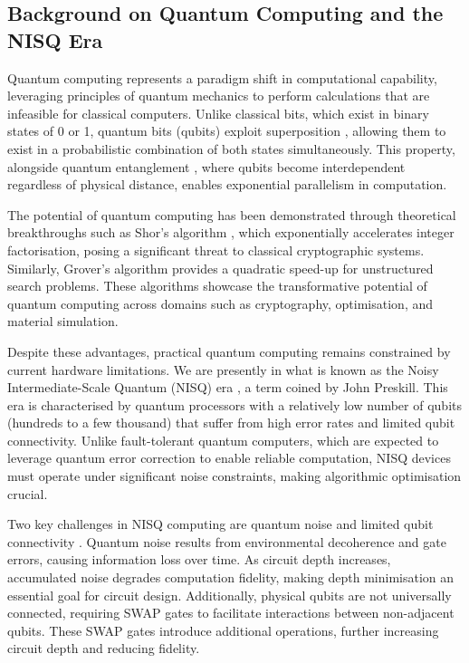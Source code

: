 \documentclass[11pt,a4paper]{article}
\begin{document}
\subsection{Background on Quantum Computing and the NISQ Era}
Quantum computing represents a paradigm shift in computational capability, leveraging principles of quantum mechanics to perform calculations that are infeasible for classical computers. Unlike classical bits, which exist in binary states of 0 or 1, quantum bits (qubits) exploit superposition \cite{Gudder1970ASP}, allowing them to exist in a probabilistic combination of both states simultaneously. This property, alongside quantum entanglement \cite{horodecki2009quantum}, where qubits become interdependent regardless of physical distance, enables exponential parallelism in computation.\newline

The potential of quantum computing has been demonstrated through theoretical breakthroughs such as Shor’s algorithm \cite{Shor365700}, which exponentially accelerates integer factorisation, posing a significant threat to classical cryptographic systems. Similarly, Grover’s algorithm \cite{Khanal2021QuantumML} provides a quadratic speed-up for unstructured search problems. These algorithms showcase the transformative potential of quantum computing across domains such as cryptography, optimisation, and material simulation.\newline

Despite these advantages, practical quantum computing remains constrained by current hardware limitations. We are presently in what is known as the Noisy Intermediate-Scale Quantum (NISQ) era \cite{Preskill2018QuantumCI}, a term coined by John Preskill. This era is characterised by quantum processors with a relatively low number of qubits (hundreds to a few thousand) that suffer from high error rates and limited qubit connectivity. Unlike fault-tolerant quantum computers, which are expected to leverage quantum error correction to enable reliable computation, NISQ devices must operate under significant noise constraints, making algorithmic optimisation crucial.\newline

Two key challenges in NISQ computing are quantum noise 
 \cite{Clerk2008IntroductionTQ} and limited qubit connectivity \cite{Preskill2018QuantumCI}. Quantum noise results from environmental decoherence and gate errors, causing information loss over time. As circuit depth increases, accumulated noise degrades computation fidelity, making depth minimisation an essential goal for circuit design. Additionally, physical qubits are not universally connected, requiring SWAP gates to facilitate interactions between non-adjacent qubits. These SWAP gates introduce additional operations, further increasing circuit depth and reducing fidelity.\newline
\end{document}
